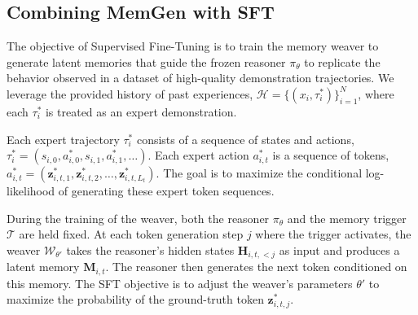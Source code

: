 \documentclass[]{fairmeta}
\newcommand{\ourmethod}{{\fontfamily{lmtt}\selectfont \textbf{MemGen}}\xspace}
\begin{document}
\subsection{Combining \ourmethod with SFT}
The objective of Supervised Fine-Tuning is to train the memory weaver to generate latent memories that guide the frozen reasoner $\pi_\theta$ to replicate the behavior observed in a dataset of high-quality demonstration trajectories. We leverage the provided history of past experiences, $\mathcal{H} = \{(x_i, \tau_i^*)\}_{i=1}^N$, where each $\tau_i^*$ is treated as an expert demonstration.

Each expert trajectory $\tau_i^*$ consists of a sequence of states and actions, $\tau_i^* = (s_{i,0}, a_{i,0}^*, s_{i,1}, a_{i,1}^*, \ldots)$. Each expert action $a_{i,t}^*$ is a sequence of tokens, $a_{i,t}^* = (\mathbf{z}_{i,t,1}^*, \mathbf{z}_{i,t,2}^*, \ldots, \mathbf{z}_{i,t,L_t}^*)$. The goal is to maximize the conditional log-likelihood of generating these expert token sequences.

During the training of the weaver, both the reasoner $\pi_\theta$ and the memory trigger $\mathcal{T}$ are held fixed. At each token generation step $j$ where the trigger activates, the weaver $\mathcal{W}_{\theta'}$ takes the reasoner's hidden states $\mathbf{H}_{i,t,<j}$ as input and produces a latent memory $\mathbf{M}_{i,t}$. The reasoner then generates the next token conditioned on this memory. The SFT objective is to adjust the weaver's parameters $\theta'$ to maximize the probability of the ground-truth token $\mathbf{z}_{i,t,j}^*$.
\end{document}
